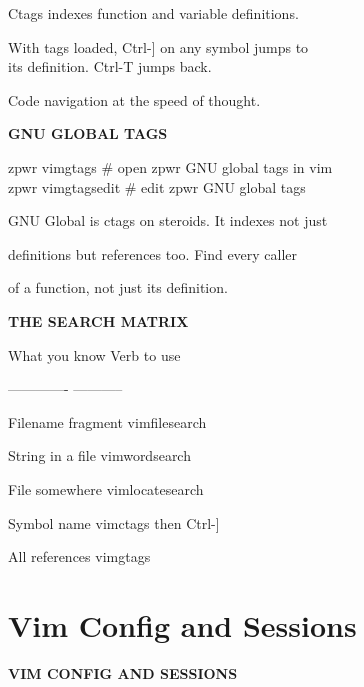 \documentclass[11pt,a4paper,twoside]{book}
\begin{document}
Ctags indexes function and variable definitions.

\begin{codebox}
With tags loaded, Ctrl-] on any symbol jumps to\\
its definition. Ctrl-T jumps back.\\
\end{codebox}

Code navigation at the speed of thought.


\vspace{12pt}
{\bfseries\color{neonyellow} GNU GLOBAL TAGS}\vspace{4pt}

\begin{codebox}
zpwr vimgtags               \# open zpwr GNU global tags in vim\\
zpwr vimgtagsedit           \# edit zpwr GNU global tags\\
\end{codebox}

GNU Global is ctags on steroids. It indexes not just

definitions but references too. Find every caller

of a function, not just its definition.


\vspace{12pt}
{\bfseries\color{neonyellow} THE SEARCH MATRIX}\vspace{4pt}

What you know       Verb to use

-------------       -----------

Filename fragment   vimfilesearch

String in a file    vimwordsearch

File somewhere      vimlocatesearch

\begin{codebox}
Symbol name         vimctags then Ctrl-]\\
\end{codebox}

All references      vimgtags


\vspace{16pt}

\section{Vim Config and Sessions}


\vspace{10pt}
{\large\bfseries\color{neoncyan} VIM CONFIG AND SESSIONS}\vspace{6pt}
\end{document}
